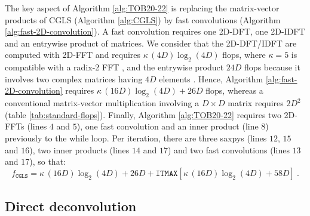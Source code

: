 The key aspect of Algorithm \ref{alg:TOB20-22} is replacing the matrix-vector products of CGLS (Algorithm \ref{alg:CGLS})
by fast convolutions (Algorithm \ref{alg:fast-2D-convolution}).
A fast convolution requires one 2D-DFT, one 2D-IDFT and an entrywise product of matrices.
We consider that the 2D-DFT/IDFT are computed with 2D-FFT and requires $\kappa \, (4D)\log_{2}(4D)$ flops, where $\kappa = 5$ is compatible with a radix-2 FFT 
\citep[][p. 16]{vanloan1992}, and the entrywise product $24D$ flops because it involves two complex matrices having $4D$ elements
\citep[][p. 36]{golub-vanloan2013}.
Hence, Algorithm \ref{alg:fast-2D-convolution} requires $\kappa \, (16D)\log_{2}(4D) + 26D$ flops,
whereas a conventional matrix-vector multiplication involving a $D \times D$ matrix requires $2D^{2}$ (table \ref{tab:standard-flops}).
Finally, Algorithm \ref{alg:TOB20-22} requires two 2D-FFTs (lines $4$ and $5$), one fast convolution and an inner product (line $8$)
previously to the while loop.
Per iteration, there are three saxpys (lines $12$, $15$ and $16$), two inner products (lines $14$ and $17$) and 
two fast convolutions (lines $13$ and $17$), so that:
\begin{equation}
	f_{\mathtt{CGLS}} = \kappa \, (16D)\log_{2}(4D) + 26D + \mathtt{ITMAX} 
	\left[
	\kappa \, (16D)\log_{2}(4D) + 58D
	\right] \: .
	\label{flops:TOB20}
\end{equation}

\subsection{Direct deconvolution}

